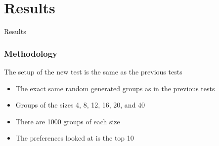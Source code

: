 \section{Results}

\begin{frame}
     \begin{center}
     	\huge Results 
     \end{center}
\end{frame}

\begin{frame}
	\frametitle{Methodology}
	The setup of the new test is the same as the previous tests
	\begin{itemize}
		\item The exact same random generated groups as in the previous tests
		\item Groups of the sizes 4, 8, 12, 16, 20, and 40
		\item There are 1000 groups of each size
		\item The preferences looked at is the top 10
	\end{itemize}
\end{frame}


